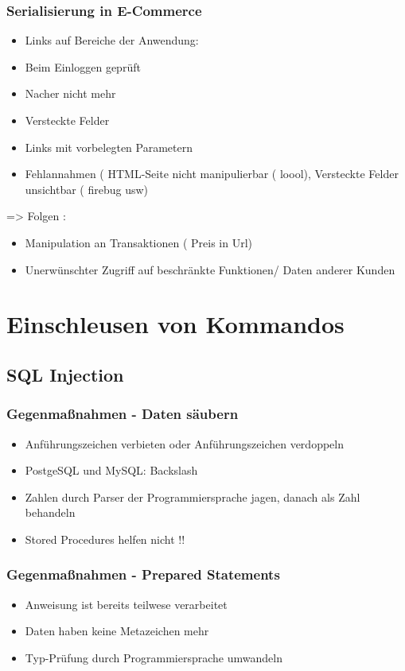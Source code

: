\subsubsection*{Serialisierung in E-Commerce }
\begin{itemize}
	\item Links auf Bereiche der Anwendung:
	\item Beim Einloggen geprüft
	\item Nacher nicht mehr
	\item Versteckte Felder
	\item Links mit vorbelegten Parametern
	\item Fehlannahmen ( HTML-Seite nicht manipulierbar ( loool), Versteckte Felder unsichtbar ( firebug usw)
\end{itemize}
=> Folgen : 
\begin{itemize}
	\item Manipulation an Transaktionen ( Preis in Url)
	\item Unerwünschter Zugriff auf beschränkte Funktionen/ Daten anderer Kunden 
\end{itemize}

\section*{Einschleusen von Kommandos}
\subsection*{ SQL Injection}
\subsubsection*{ Gegenmaßnahmen - Daten säubern }
\begin{itemize}
	\item Anführungszeichen verbieten oder Anführungszeichen verdoppeln
	\item PostgeSQL und MySQL: Backslash \
	\item Zahlen durch Parser der Programmiersprache jagen, danach als Zahl behandeln
	\item  Stored Procedures helfen nicht !!
\end{itemize}

\subsubsection*{Gegenmaßnahmen - Prepared Statements }
\begin{itemize}
	\item  Anweisung ist bereits teilwese verarbeitet
	\item Daten haben keine Metazeichen mehr
	\item Typ-Prüfung durch Programmiersprache umwandeln
\end{itemize}

